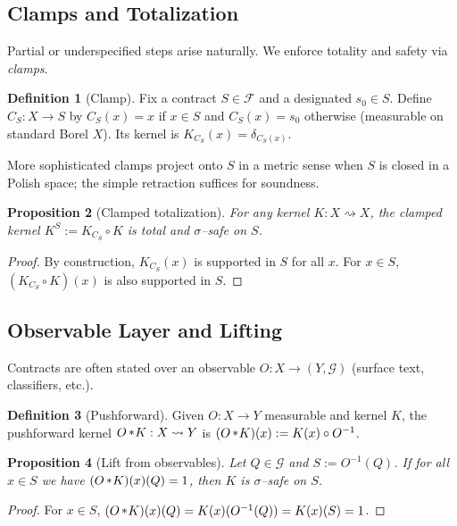 \documentclass[11pt]{article}
\theoremstyle{definition}
\newtheorem{definition}{Definition}[section]
\theoremstyle{plain}
\newtheorem{proposition}[definition]{Proposition}
\theoremstyle{remark}
\newcommand{\X}{X}
\newcommand{\F}{\mathcal{F}}
\newcommand{\G}{\mathcal{G}}
\newcommand{\1}{\mathbf{1}}
\newcommand{\pushfwd}{\mathbin{\!\!\;\raisebox{0.2ex}{\small$\ast$}\!}}
\newcommand{\clamp}{C}
\begin{document}
\subsection{Clamps and Totalization}
Partial or underspecified steps arise naturally. We enforce totality and safety via \emph{clamps}.

\begin{definition}[Clamp]\label{def:clamp}
Fix a contract $S\in\F$ and a designated $s_0\in S$. Define $\clamp_S:\X\to S$ by $\clamp_S(x)=x$ if $x\in S$ and $\clamp_S(x)=s_0$ otherwise (measurable on standard Borel $\X$). Its kernel is $K_{\clamp_S}(x)=\delta_{\clamp_S(x)}$.
\end{definition}

More sophisticated clamps project onto $S$ in a metric sense when $S$ is closed in a Polish space; the simple retraction suffices for soundness.

\begin{proposition}[Clamped totalization]\label{prop:totalize}
For any kernel $K:\X\rightsquigarrow \X$, the clamped kernel $K^S := K_{\clamp_S}\circ K$ is total and $\sigma$--safe on $S$.
\end{proposition}
\begin{proof}
By construction, $K_{\clamp_S}(x)$ is supported in $S$ for all $x$. For $x\in S$, $(K_{\clamp_S}\circ K)(x)$ is also supported in $S$.
\end{proof}

\subsection{Observable Layer and Lifting}
Contracts are often stated over an observable $O:\X\to (Y,\G)$ (surface text, classifiers, etc.).

\begin{definition}[Pushforward]\label{def:pushforward}
Given $O:\X\to Y$ measurable and kernel $K$, the pushforward kernel $O\pushfwd K:\X\rightsquigarrow Y$ is $(O\pushfwd K)(x):=K(x)\circ O^{-1}$.
\end{definition}

\begin{proposition}[Lift from observables]\label{prop:lift}
Let $Q\in\G$ and $S:=O^{-1}(Q)$. If for all $x\in S$ we have $(O\pushfwd K)(x)(Q)=1$, then $K$ is $\sigma$--safe on $S$.
\end{proposition}
\begin{proof}
For $x\in S$, $(O\pushfwd K)(x)(Q)=K(x)(O^{-1}(Q))=K(x)(S)=1$.
\end{proof}
\end{document}
